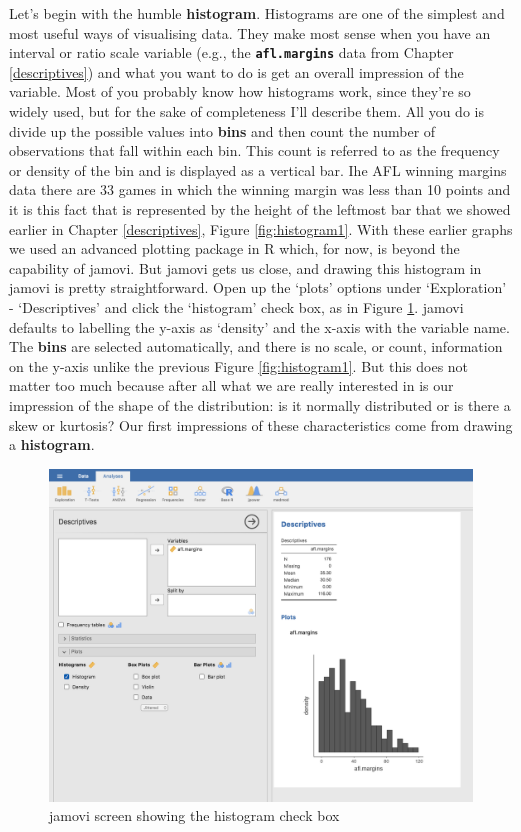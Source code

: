 \documentclass[
]{book}
\begin{document}
Let's begin with the humble {\textbf{histogram}}. Histograms are one of the simplest and most useful ways of visualising data. They make most sense when you have an interval or ratio scale variable (e.g., the \textbf{\texttt{afl.margins}} data from Chapter \ref{descriptives}) and what you want to do is get an overall impression of the variable. Most of you probably know how histograms work, since they're so widely used, but for the sake of completeness I'll describe them. All you do is divide up the possible values into {\textbf{bins}} and then count the number of observations that fall within each bin. This count is referred to as the frequency or density of the bin and is displayed as a vertical bar. Ihe AFL winning margins data there are 33 games in which the winning margin was less than 10 points and it is this fact that is represented by the height of the leftmost bar that we showed earlier in Chapter \ref{descriptives}, Figure \ref{fig:histogram1}. With these earlier graphs we used an advanced plotting package in R which, for now, is beyond the capability of jamovi. But jamovi gets us close, and drawing this histogram in jamovi is pretty straightforward. Open up the `plots' options under `Exploration' - `Descriptives' and click the `histogram' check box, as in Figure \ref{fig:jamovihistogram}. jamovi defaults to labelling the y-axis as `density' and the x-axis with the variable name. The {\textbf{bins}} are selected automatically, and there is no scale, or count, information on the y-axis unlike the previous Figure \ref{fig:histogram1}. But this does not matter too much because after all what we are really interested in is our impression of the shape of the distribution: is it normally distributed or is there a skew or kurtosis? Our first impressions of these characteristics come from drawing a {\textbf{histogram}}.

\begin{figure}

{\centering \includegraphics[width=1\linewidth]{img/graphics/jamovi_histogram} 

}

\caption{jamovi screen showing the histogram check box}\label{fig:jamovihistogram}
\end{figure}
\end{document}
